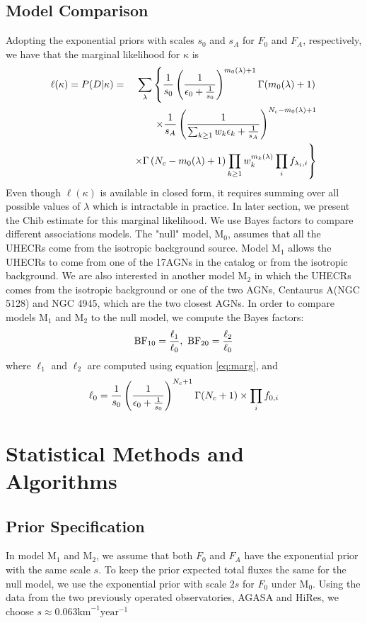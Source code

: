 \documentclass[dvips,aoas]{imsart}
\newcommand{\be}{\begin{equation}}
\newcommand{\ee}{\end{equation}}
\newcommand{\ba}{\begin{eqnarray}}
\newcommand{\ea}{\end{eqnarray}}
\begin{document}
\subsection{Model Comparison}
Adopting the exponential priors with scales $s_0$ and $s_A$ for $F_0$ and $F_A$, respectively, we have
that the marginal likelihood for $\kappa$ is
\ba  \label{eq:marg}
\ell(\kappa) = P(D|\kappa) &=& \sum_\lambda \left\{{1\over s_0}\left({1\over \epsilon_0+{1\over s_0}}\right)^{m_0(\lambda)+1}\Gamma(m_0(\lambda)+1)\right.\nonumber\\
& & \times {1\over s_A}\left({1\over \sum_{k\geq 1}w_k\epsilon_k+{1\over s_A}}\right)^{N_c-m_0(\lambda)+1}\nonumber\\
& &\left.\times \Gamma\left(N_c-m_0(\lambda)+1\right)\prod_{k\geq1}w_k^{m_k(\lambda)}\prod_i f_{\lambda_i,i}\right\}
\ea
Even though $\ell(\kappa)$ is available in closed form, it requires summing over all possible values of $\lambda$
which is intractable in practice. In later section, we present the Chib estimate for this marginal likelihood.
We use Bayes factors to compare different associations models. The "null" model, M$_0$, assumes that all the
UHECRs come from the isotropic background source. Model M$_1$ allows the UHECRs to come from one of the
17AGNs in the catalog or from the isotropic background. We are also interested in another model M$_2$ in which
the UHECRs comes from the isotropic background or one of the two AGNs, Centaurus A(NGC 5128) and NGC 4945,
 which are the two closest AGNs. In order to compare models M$_1$ and M$_2$ to the null model, we compute the Bayes factors:
\be
\mbox{BF}_{10} = {\ell_1\over\ell_0}, \mbox{ BF}_{20} = {\ell_2\over\ell_0}
\ee
where $\ell_1$ and $\ell_2$ are computed using equation \ref{eq:marg}, and
\be
\ell_0 = {1\over s_0}\left(1\over \epsilon_0+{1\over s_0}\right)^{N_c+1} \Gamma(N_c+1) \times \prod_i f_{0,i}
\ee

\section{Statistical Methods and Algorithms}
\subsection{Prior Specification} In model M$_1$ and M$_2$, we assume that both $F_0$ and $F_A$ have
the exponential prior with the same scale $s$. To keep the prior expected total fluxes the same for the null
model, we use the exponential prior with scale $2s$ for $F_0$ under M$_0$. Using the data from the
two previously operated observatories, AGASA and HiRes, we choose $s\approx 0.063 \mbox{km}^{-1}\mbox{year}^{-1}$
\end{document}

